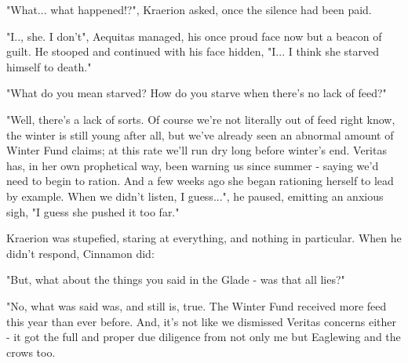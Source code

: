 

"What... what happened!?", Kraerion asked, once the silence had been paid.

"I.., she. I don't", Aequitas managed, his once proud face now but a beacon of guilt. He stooped and continued with his face hidden, "I... I think she starved himself to death."

"What do you mean starved? How do you starve when there's no lack of feed?"

"Well, there's a lack of sorts. Of course we're not literally out of feed right know, the winter is still young after all, but we've already seen an abnormal amount of Winter Fund claims; at this rate we'll run dry long before winter's end. Veritas has, in her own prophetical way, been warning us since summer - saying we'd need to begin to ration. And a few weeks ago she began rationing herself to lead by example. When we didn't listen, I guess...", he paused, emitting an anxious sigh, "I guess she pushed it too far."

Kraerion was stupefied, staring at everything, and nothing in particular. When he didn't respond, Cinnamon did:

"But, what about the things you said in the Glade - was that all lies?"

"No, what was said was, and still is, true. The Winter Fund received more feed this year than ever before. And, it's not like we dismissed Veritas concerns either - it got the full and proper due diligence from not only me but Eaglewing and the crows too.%

